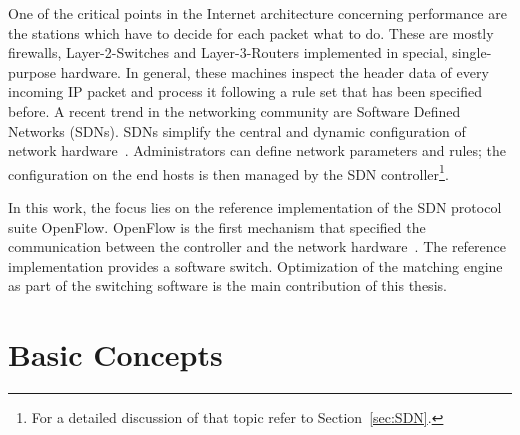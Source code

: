 \documentclass[a4paper,
		12pt,
		parskip=full,
		titlepage
		]{scrartcl}
\begin{document}
One of the critical points in the Internet architecture concerning performance 
are the stations which have to decide for each packet what to do.
These are mostly firewalls, Layer-2-Switches and Layer-3-Routers implemented in special, single-purpose hardware.
In general, these machines inspect the header data of every incoming IP packet and process it 
following a rule set that has been specified before.
A recent trend in the networking community are Software Defined Networks (SDNs).
SDNs simplify the central and dynamic configuration of network hardware~\cite{onf_whitepaper}.
Administrators can define network parameters and rules; the configuration 
on the end hosts is then managed by the SDN controller\footnote{For a detailed discussion of that topic refer to Section~\ref{sec:SDN}.}.

In this work, the focus lies on the reference implementation of the SDN protocol suite OpenFlow.
OpenFlow is the first mechanism that specified the communication between the controller and the network hardware~\cite{onf_whitepaper}.
The reference implementation provides a software switch.
Optimization of the matching engine as part of the switching software is the main contribution of this thesis.

\section{Basic Concepts}
\end{document}

